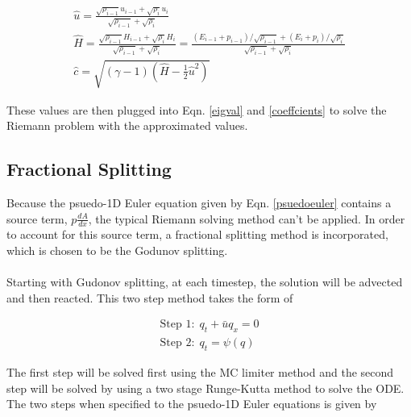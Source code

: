 \documentclass{article}%
\numberwithin{equation}{section}
\begin{document}
\begin{equation}
\begin{split}
\hat{u}= \frac{\sqrt{\rho_{i - 1}} u_{i-1} + \sqrt{\rho_i} u_i}{\sqrt{\rho_{i-1}} + \sqrt{\rho_i}}  \\
\hat{H} = \frac{\sqrt{\rho_{i - 1}} H_{i-1} + \sqrt{\rho_i} H_i}{\sqrt{\rho_{i-1}} + \sqrt{\rho_i}} = \frac{(E_{i-1} + p_{i-1})/\sqrt{\rho_{i - 1}}+ (E_i + p_i) / \sqrt{\rho_i} }{\sqrt{\rho_{i-1}} + \sqrt{\rho_i}} \\
\hat{c} = \sqrt{(\gamma - 1) \left( \hat{H} - \frac{1}{2} \hat{u}^2 \right)}
\end{split}
\end{equation}

These values are then plugged into Eqn. \ref{eigval} and \ref{coeffcients} to solve the Riemann problem with the approximated values.

\subsection{Fractional Splitting}
Because the psuedo-1D Euler equation given by Eqn. \ref{psuedoeuler} contains a source term, $p \frac{dA}{dx}$, the typical Riemann solving method can't be applied. In order to account for this source term, a fractional splitting method is incorporated, which is chosen to be the Godunov splitting.
\\
\\
Starting with Gudonov splitting, at each timestep, the solution will be advected and then reacted. This two step method takes the form of

\begin{equation}
\begin{split}
\text{Step 1:} \ \ q_t + \bar{u} q_x = 0 \\
\text{Step 2:} \ \ q_t = \psi(q)
\end{split}
\end{equation}  

The first step will be solved first using the MC limiter method and the second step will be solved by using a two stage Runge-Kutta method to solve the ODE. The two steps when specified to the psuedo-1D Euler equations is given by
\end{document}
